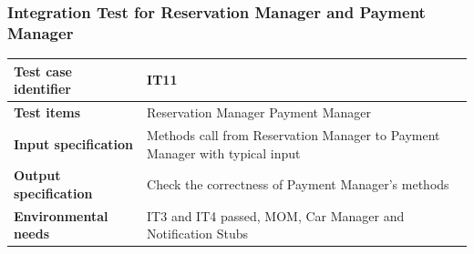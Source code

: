 \documentclass{article}
\begin{document}
			\subsubsection{Integration Test for Reservation Manager and Payment Manager} \label{sec:3.1.9}
				\begin{minipage}{\linewidth}
				\end{minipage}
				\begin{center}
					\setlength{\tabcolsep}{24pt}
					\renewcommand{\arraystretch}{1.4}
					\begin{tabular}{ | l | p{8cm} |}\hline
						\textbf{Test case identifier} & IT11\\\hline
						\textbf{Test items} & Reservation Manager \textrightarrow Payment Manager\\\hline
						\textbf{Input specification} & Methods call from Reservation Manager to Payment Manager with typical input \\\hline
						\textbf{Output specification} & Check the correctness of Payment Manager's methods \\\hline
						\textbf{Environmental needs} & IT3 and IT4 passed, MOM, Car Manager and Notification Stubs \\\hline
					\end{tabular}
				\end{center}
				\pagebreak
\end{document}
